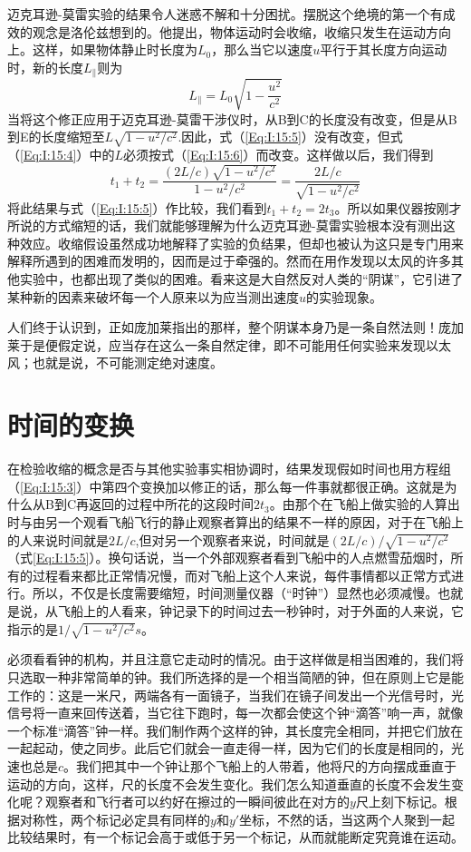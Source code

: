 迈克耳逊-莫雷实验的结果令人迷惑不解和十分困扰。摆脱这个绝境的第一个有成效的观念是洛伦兹想到的。他提出，物体运动时会收缩，收缩只发生在运动方向上。这样，如果物体静止时长度为$L_0$，那么当它以速度$u$平行于其长度方向运动时，新的长度$L_\parallel$则为
\begin{equation}
    \label{Eq:I:15:6}
    L_\parallel = L_0 \sqrt{1-\frac{u^2}{c^2}}
\end{equation}
当将这个修正应用于迈克耳逊-莫雷干涉仪时，从B到C的长度没有改变，但是从B到E的长度缩短至$L\sqrt{1-u^2/c^2}$.因此，式（\ref{Eq:I:15:5}）没有改变，但式（\ref{Eq:I:15:4}）中的$L$必须按式（\ref{Eq:I:15:6}）而改变。这样做以后，我们得到
\begin{equation}
    \label{Eq:I:15:7}
    t_1 + t_2 = \frac{(2L/c)\sqrt{1-u^2/c^2}}{1-u^2/c^2}=\frac{2L/c}{\sqrt{1-u^2/c^2}}
\end{equation}
将此结果与式（\ref{Eq:I:15:5}）作比较，我们看到$t_1+t_2=2t_3$。所以如果仪器按刚才所说的方式缩短的话，我们就能够理解为什么迈克耳逊-莫雷实验根本没有测出这种效应。收缩假设虽然成功地解释了实验的负结果，但却也被认为这只是专门用来解释所遇到的困难而发明的，因而是过于牵强的。然而在用作发现以太风的许多其他实验中，也都出现了类似的困难。看来这是大自然反对人类的“阴谋”，它引进了某种新的因素来破坏每一个人原来以为应当测出速度$u$的实验现象。

人们终于认识到，正如庞加莱指出的那样，整个阴谋本身乃是一条自然法则！庞加莱于是便假定说，应当存在这么一条自然定律，即不可能用任何实验来发现以太风；也就是说，不可能测定绝对速度。

\section{时间的变换}

在检验收缩的概念是否与其他实验事实相协调时，结果发现假如时间也用方程组（\ref{Eq:I:15:3}）中第四个变换加以修正的话，那么每一件事就都很正确。这就是为什么从B到C再返回的过程中所花的这段时间$2t_3$。由那个在飞船上做实验的人算出时与由另一个观看飞船飞行的静止观察者算出的结果不一样的原因，对于在飞船上的人来说时间就是$2L/c$,但对另一个观察者来说，时间就是$(2L/c)/\sqrt{1-u^2/c^2}$（式\ref{Eq:I:15:5}）。换句话说，当一个外部观察者看到飞船中的人点燃雪茄烟时，所有的过程看来都比正常情况慢，而对飞船上这个人来说，每件事情都以正常方式进行。所以，不仅是长度需要缩短，时间测量仪器（“时钟”）显然也必须减慢。也就是说，从飞船上的人看来，钟记录下的时间过去一秒钟时，对于外面的人来说，它指示的是$1/\sqrt{1-u^2/c^2}s$。

必须看看钟的机构，并且注意它走动时的情况。由于这样做是相当困难的，我们将只选取一种非常简单的钟。我们所选择的是一个相当简陋的钟，但在原则上它是能工作的：这是一米尺，两端各有一面镜子，当我们在镜子间发出一个光信号时，光信号将一直来回传送着，当它往下跑时，每一次都会使这个钟“滴答”响一声，就像一个标准“滴答”钟一样。我们制作两个这样的钟，其长度完全相同，并把它们放在一起起动，使之同步。此后它们就会一直走得一样，因为它们的长度是相同的，光速也总是$c$。我们把其中一个钟让那个飞船上的人带着，他将尺的方向摆成垂直于运动的方向，这样，尺的长度不会发生变化。我们怎么知道垂直的长度不会发生变化呢？观察者和飞行者可以约好在擦过的一瞬间彼此在对方的$y$尺上刻下标记。根据对称性，两个标记必定具有同样的$y$和$y'$坐标，不然的话，当这两个人聚到一起比较结果时，有一个标记会高于或低于另一个标记，从而就能断定究竟谁在运动。

